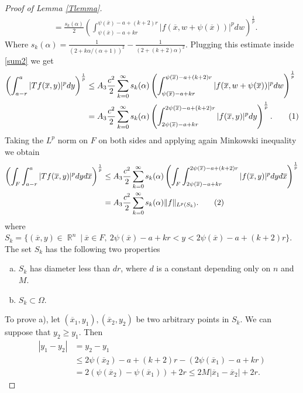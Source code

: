 \documentclass[12pt]{article}
\theoremstyle{definition}
\DeclareMathOperator\rr{\mathbb{R}}
\newcommand\addtag{\refstepcounter{equation}\tag{\theequation}}
\begin{document}
\begin{proof}[Proof of Lemma \ref{Tlemma}]
\begin{align*}
&=\frac{s_k(\alpha)}{2} \left ( \int_{\psi(\overline x)-a+kr}^{\psi(\overline x)-a+(k+2)r}|f(\overline x, w+\psi(\overline x))|^p  dw \right) ^{\frac{1}{p}}.
\end{align*}
Where $s_k(\alpha)=\frac{1}{(2+k\alpha/(\alpha+1))^2} -\frac{1}{(2+(k+2)\alpha)^2}.$ Plugging this estimate inside \eqref{sum2} we get
\begin{align*}
 \left(\int_{a-r}^{a}|Tf(\overline x,y)|^p dy\right)^{\frac{1}{p}} &\le A_3\frac{c^2}{2} \sum_{k=0}^\infty s_k(\alpha) \left ( \int_{\psi(\overline x) -a+kr}^{\psi(\overline x) -a+(k+2)r}|f(\overline x, w+\psi(\overline x))|^p  dw \right) ^{\frac{1}{p}} \\
&= A_3\frac{c^2}{2} \sum_{k=0}^\infty s_k(\alpha) \left ( \int_{2\psi(\overline x) -a+kr}^{2\psi(\overline x) -a+(k+2)r}|f(\overline x, y)|^p  dy \right) ^{\frac{1}{p}}. \addtag \label{sum3}\\
\end{align*}
Taking the $L^p$ norm on $F$ on both sides and applying again Minkowski inequality we obtain
\begin{align*}
\left(\int_F\int_{a-r}^{a}|Tf(\overline x,y)|^p dy d\overline x\right)^{\frac{1}{p}} &\le A_3 \frac{c^2}{2} \sum_{k=0}^\infty s_k(\alpha) \left (\int_F \int_{2\psi(\overline x) -a+kr}^{2\psi(\overline x) -a+(k+2)r}|f(\overline x, y)|^p  dy d\overline x\right) ^{\frac{1}{p}}\\
&=A_3 \frac{c^2}{2} \sum_{k=0}^\infty s_k(\alpha) \|f\|_{L^p(S_k)}. \addtag \label{finalsum}\\
\end{align*}
where $S_k=\{ (\overline x, y) \in \rr^n \ | \ \overline x \in F ,\  2\psi(\overline x) -a+kr < y < 2\psi(\overline x) -a+(k+2)r \}$. The set $S_k$ has the following two properties 
\begin{enumerate}[a)]
 	\item $S_k$ has diameter less than $dr$, where $d$ is a constant depending only on $n$ and $M$.
 	\item $S_k \subset \Omega$.
 \end{enumerate}  To prove a), let $(\overline x_1,y_1),(\overline x_2,y_2)$ be two arbitrary points in $S_k$. We can suppose that $y_2\ge y_1.$ Then 
\begin{align*}
|y_1-y_2|&=y_2-y_1 \\
		&\le2\psi(\overline x_2)-a+(k+2)r -(2\psi(\overline x_1) -a+kr) \\
		&=2 (\psi(\overline x_2)-\psi(\overline x_1))+2r\le 2M|\overline x_1 - \overline x_2|+2r.
\end{align*}

\end{proof}
\end{document}

